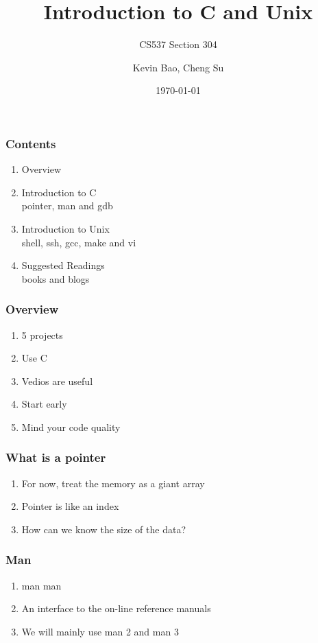 \documentclass{beamer}
\title{Introduction to C and Unix}
\subtitle{CS537 Section 304}
\author{Kevin Bao, Cheng Su}
\date{\today}
\begin{document}
	\setcounter{framenumber}{0}
	\frame{\titlepage}
	\setcounter{showProgressBar}{1}
	\setcounter{showSlideNumbers}{1}

	\begin{frame}
		\frametitle{Contents}
		\begin{enumerate}
			\item Overview \\
			\item Introduction to C \\ 
				\textcolor{ExecusharesGrey}{\footnotesize\hspace{1em} pointer, man and gdb}
			\item Introduction to Unix  \\ 
				\textcolor{ExecusharesGrey}{\footnotesize\hspace{1em} shell, ssh, gcc, make and vi}
			\item Suggested Readings \\ 
				\textcolor{ExecusharesGrey}{\footnotesize\hspace{1em} books and blogs}
		\end{enumerate}
	\end{frame}

  \begin{frame}
    \frametitle{Overview}
		\begin{enumerate}
			\item 5 projects
			\item Use C
			\item Vedios are useful
			\item Start early
			\item Mind your code quality
		\end{enumerate}
	\end{frame}

  \begin{frame}
    \frametitle{What is a pointer}
    \begin{enumerate}
      \item For now, treat the memory as a giant array
      \item Pointer is like an index
      \item How can we know the size of the data?
    \end{enumerate}
  \end{frame}

  \begin{frame}
    \frametitle{Man}
    \begin{enumerate}
      \item man man
      \item An interface to the on-line reference manuals
      \item We will mainly use man 2 and man 3
    \end{enumerate}
  \end{frame}
\end{document}
